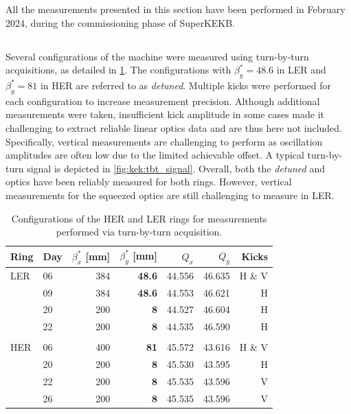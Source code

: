 All the measurements presented in this section have been performed in February 2024, during the
commissioning phase of SuperKEKB.

\subsection{}

Several configurations of the machine were measured using turn-by-turn acquisitions, as detailed in
\cref{tab:superkekb:configurations}. The configurations with $\beta_y^* = 48.6$ in LER and
$\beta_y^* = 81$ in HER are referred to as \textit{detuned}. Multiple kicks were performed for each
configuration to increase measurement precision. Although additional measurements were taken,
insufficient kick amplitude in some cases made it challenging to extract reliable linear optics
data and are thus here not included. Specifically, vertical measurements are challenging to perform
as oscillation amplitudes are often low due to the limited achievable offset.
A typical turn-by-turn signal is depicted in \cref{fig:kek:tbt_signal}.
Overall, both the \textit{detuned} and  optics have been reliably measured for
both rings. However, vertical measurements for the squeezed optics are still challenging to measure 
in LER.

\begin{table}
    \centering
    \begin{tabular}{llrrrrr}
    \hline
    Ring & Day & $\beta_x^*$ [mm] & $\beta_y^*$ [mm] & $Q_x$ & $Q_y$ & Kicks\\
    \hline
    LER        & 06 & 384 &\textbf{48.6} & 44.556 & 46.635 & H \& V \\
               & 09 & 384 &\textbf{48.6} & 44.553 & 46.621 & H  \\
               \hdashline
               & 20 & 200 & \textbf{8}   & 44.527 & 46.604 & H \\
               & 22 & 200 & \textbf{8}   & 44.535 & 46.590 & H \\
               &&&&&& \\
    HER        & 06 & 400 & \textbf{81}  & 45.572 & 43.616 & H \& V\\
               \hdashline
               & 20 & 200 & \textbf{8} & 45.530 & 43.595 & H \\
               & 22 & 200 & \textbf{8} & 45.535 & 43.596 & V \\
               & 26 & 200 & \textbf{8} & 45.535 & 43.596 & V \\
    \bottomrule
    \end{tabular}
  \caption{Configurations of the HER and LER rings for measurements performed via turn-by-turn
  acquisition.}
  \label{tab:superkekb:configurations}
\end{table}


